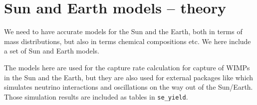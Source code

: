 \section{Sun and Earth models -- theory}


We need to have accurate models for the Sun and the Earth, both in terms of mass distributions, but also in terms chemical compositions etc. We here include
a set of Sun and Earth models.

The models here are used for the capture rate calculation for capture of WIMPs in the Sun and the Earth, but they are also used for external packages like  which simulates neutrino interactions and oscillations on the way out of the Sun/Earth. Those simulation results are included as tables in \texttt{se\_yield}.
 